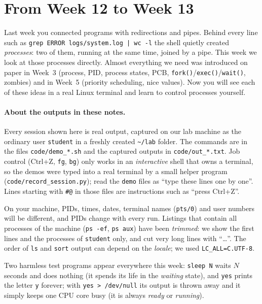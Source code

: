 \documentclass[11pt,a4paper]{article}
\newcommand{\cmd}[1]{\texttt{#1}}
\begin{document}
\setcounter{tocdepth}{1}
\tableofcontents

\section{From Week 12 to Week 13}

Last week you connected programs with redirections and pipes. Behind every line such as \cmd{grep ERROR logs/system.log | wc -l} the shell quietly created \emph{processes}: two of them, running at the same time, joined by a pipe. This week we look at those processes directly. Almost everything we need was introduced on paper in Week~3 (process, PID, process states, PCB, \cmd{fork()}/\cmd{exec()}/\cmd{wait()}, zombies) and in Week~5 (priority scheduling, nice values). Now you will see each of these ideas in a real Linux terminal and learn to control processes yourself.

\paragraph{About the outputs in these notes.} Every session shown here is real output, captured on our lab machine as the ordinary user \texttt{student} in a freshly created \texttt{\textasciitilde/lab} folder. The commands are in the files \texttt{code/demo\_*.sh} and the captured outputs in \texttt{code/out\_*.txt}. Job control (Ctrl+Z, \cmd{fg}, \cmd{bg}) only works in an \emph{interactive} shell that owns a terminal, so the demos were typed into a real terminal by a small helper program (\texttt{code/record\_session.py}); read the \texttt{demo} files as ``type these lines one by one''. Lines starting with \texttt{\#@} in those files are instructions such as ``press Ctrl+Z''.

On your machine, PIDs, times, dates, terminal names (\texttt{pts/0}) and user numbers will be different, and PIDs change with every run. Listings that contain all processes of the machine (\cmd{ps -ef}, \cmd{ps aux}) have been \emph{trimmed}: we show the first lines and the processes of \texttt{student} only, and cut very long lines with ``\dots''. The order of \cmd{ls} and \cmd{sort} output can depend on the \emph{locale}; we used \cmd{LC\_ALL=C.UTF-8}.

Two harmless test programs appear everywhere this week: \cmd{sleep N} waits $N$ seconds and does nothing (it spends its life in the \emph{waiting} state), and \cmd{yes} prints the letter \texttt{y} forever; with \cmd{yes > /dev/null} its output is thrown away and it simply keeps one CPU core busy (it is always \emph{ready} or \emph{running}).
\end{document}
